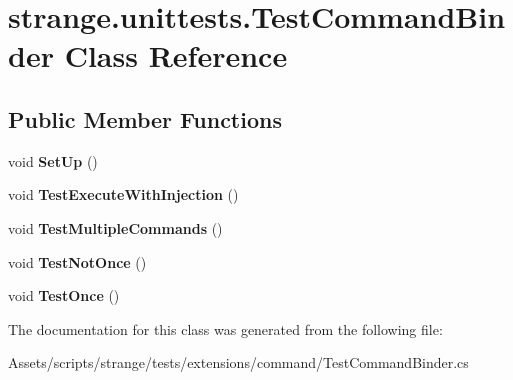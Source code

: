 \hypertarget{classstrange_1_1unittests_1_1_test_command_binder}{\section{strange.\-unittests.\-Test\-Command\-Binder Class Reference}
\label{classstrange_1_1unittests_1_1_test_command_binder}
}
\subsection*{Public Member Functions}
\begin{DoxyCompactItemize}
\item 
\hypertarget{classstrange_1_1unittests_1_1_test_command_binder_af41429c096b9398393432765acbc2e4e}{void {\bfseries Set\-Up} ()}\label{classstrange_1_1unittests_1_1_test_command_binder_af41429c096b9398393432765acbc2e4e}

\item 
\hypertarget{classstrange_1_1unittests_1_1_test_command_binder_a473c79aacd30c36f4155de7a090ac23a}{void {\bfseries Test\-Execute\-With\-Injection} ()}\label{classstrange_1_1unittests_1_1_test_command_binder_a473c79aacd30c36f4155de7a090ac23a}

\item 
\hypertarget{classstrange_1_1unittests_1_1_test_command_binder_a5bf5d368b224dbf51621f6af3099d3e4}{void {\bfseries Test\-Multiple\-Commands} ()}\label{classstrange_1_1unittests_1_1_test_command_binder_a5bf5d368b224dbf51621f6af3099d3e4}

\item 
\hypertarget{classstrange_1_1unittests_1_1_test_command_binder_a2eac2f8cd1b27439df6dae617835b298}{void {\bfseries Test\-Not\-Once} ()}\label{classstrange_1_1unittests_1_1_test_command_binder_a2eac2f8cd1b27439df6dae617835b298}

\item 
\hypertarget{classstrange_1_1unittests_1_1_test_command_binder_a6cfaa20e47df93b9849a3c65c035ebf1}{void {\bfseries Test\-Once} ()}\label{classstrange_1_1unittests_1_1_test_command_binder_a6cfaa20e47df93b9849a3c65c035ebf1}

\end{DoxyCompactItemize}


The documentation for this class was generated from the following file\-:\begin{DoxyCompactItemize}
\item 
Assets/scripts/strange/tests/extensions/command/Test\-Command\-Binder.\-cs\end{DoxyCompactItemize}
